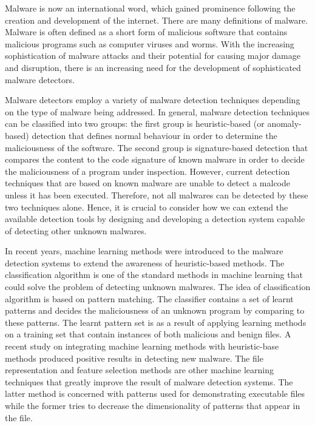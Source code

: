 Malware is now an international word, which gained prominence following the creation and development of the internet. There are many definitions of malware. Malware is often defined as a short form of malicious software that contains malicious programs such as computer viruses and worms. With the increasing sophistication of malware attacks and their potential for causing major damage and disruption, there is an increasing need for the development of sophisticated malware detectors.\cite{Malware-tech}

Malware detectors employ a variety of malware detection techniques depending on the type of malware being addressed. In general, malware detection techniques can be classified into two groups: the first group is heuristic-based (or anomaly-based) detection that defines normal behaviour in order to determine the maliciousness of the software. The second group is signature-based detection that compares the content to the code signature of known malware in order to decide the maliciousness of a program under inspection. However, current detection techniques that are based on known malware are unable to detect a malcode unless it has been executed. Therefore, not all malwares can be detected by these two techniques alone. Hence, it is crucial to consider how we can extend the available detection tools by designing and developing a detection system capable of detecting other unknown malwares.\cite{Malware-tech}
 

In recent years, machine learning methods were introduced to the malware detection systems to extend the awareness of heuristic-based methods. The classification algorithm is one of the standard methods in machine learning that could solve the problem of detecting unknown malwares. \cite{Machin-lear}
The idea of classification algorithm is based on pattern matching. The classifier contains a set of learnt patterns and decides the maliciousness of an unknown program by comparing to these patterns. The learnt pattern set is as a result of applying learning methods on a training set that contain instances of both malicious and benign files. A recent study on integrating machine learning methods with heuristic-base methods produced positive results in detecting new malware.\cite{Machin-lear}
The file representation and feature selection methods are other machine learning techniques that greatly improve the result of malware detection systems. The latter method is concerned with patterns used for demonstrating executable files while the former tries to decrease the dimensionality of patterns that appear in the file.\cite{Machin-lear}

